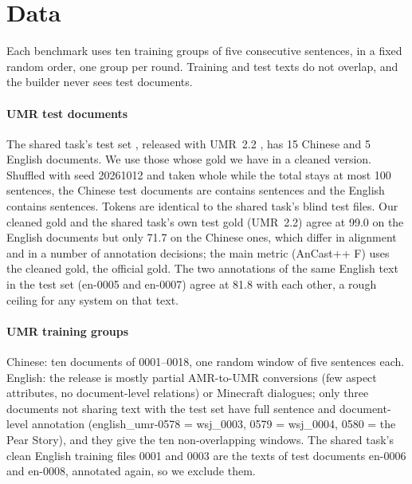\section{Data}
\label{app:data}

Each benchmark uses ten training groups of five consecutive sentences, in a fixed random order, one group per round. Training and test texts do not overlap, and the builder never sees test documents.

\paragraph{UMR test documents} The shared task's test set \citep{stepanek2026first}, released with UMR~2.2 \citep{bonn2026uniform}, has 15 Chinese and 5 English documents. We use those whose gold we have in a cleaned version. Shuffled with seed 20261012 and taken whole while the total stays at most 100 sentences, the Chinese test documents are contains \nTestZh{} sentences and the English contains \nTestEn{} sentences. Tokens are identical to the shared task's blind test files. Our cleaned gold and the shared task's own test gold (UMR~2.2) agree at \jumach{} 99.0 on the English documents but only 71.7 on the Chinese ones, which differ in alignment and in a number of annotation decisions; the main metric (AnCast++ F) uses the cleaned gold, \jumach{} the official gold. The two annotations of the same English text in the test set (en-0005 and en-0007) agree at \jumach{} 81.8 with each other, a rough ceiling for any system on that text.

\paragraph{UMR training groups} Chinese: ten documents of 0001--0018, one random window of five sentences each. English: the release is mostly partial AMR-to-UMR conversions (few aspect attributes, no document-level relations) or Minecraft dialogues; only three documents not sharing text with the test set have full sentence and document-level annotation (english\_umr-0578 = wsj\_0003, 0579 = wsj\_0004, 0580 = the Pear Story), and they give the ten non-overlapping windows. The shared task's clean English training files 0001 and 0003 are the texts of test documents en-0006 and en-0008, annotated again, so we exclude them.

